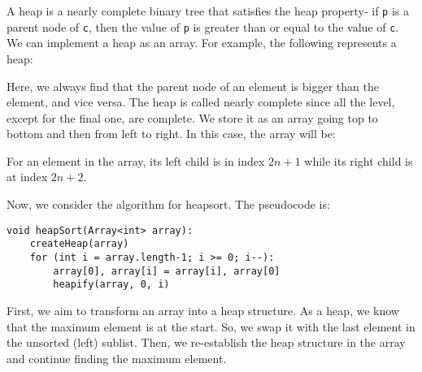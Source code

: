 \documentclass[a4paper, openany]{memoir}
\begin{document}
\noindent A heap is a nearly complete binary tree that satisfies the heap property- if \texttt{p} is a parent node of \texttt{c}, then the value of \texttt{p} is greater than or equal to the value of \texttt{c}. We can implement a heap as an array. For example, the following represents a heap:
\begin{center}
\end{center}
Here, we always find that the parent node of an element is bigger than the element, and vice versa. The heap is called nearly complete since all the level, except for the final one, are complete. We store it as an array going top to bottom and then from left to right. In this case, the array will be:
\begin{center}
\end{center}
For an element in the array, its left child is in index $2n + 1$ while its right child is at index $2n + 2$.

\noindent Now, we consider the algorithm for heapsort. The pseudocode is:
\begin{lstlisting}[language=pseudocode]
void heapSort(Array<int> array):
    createHeap(array)
    for (int i = array.length-1; i >= 0; i--):
        array[0], array[i] = array[i], array[0]
        heapify(array, 0, i)
\end{lstlisting}
First, we aim to transform an array into a heap structure. As a heap, we know that the maximum element is at the start. So, we swap it with the last element in the unsorted (left) sublist. Then, we re-establish the heap structure in the array and continue finding the maximum element.
\end{document}
